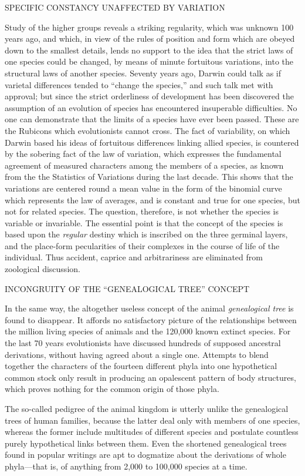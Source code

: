 SPECIFIC CONSTANCY UNAFFECTED BY VARIATION

Study of the higher groups reveals a striking regularity, which was unknown 100 years ago,
and which, in view of the rules of position and form which are obeyed down to the smallest
details, lends no support to the idea that the strict laws of one species could be changed, by
means of minute fortuitous variations, into the structural laws of another species. Seventy
years ago, Darwin could talk as if varietal differences tended to ``change the species,'' and
such talk met with approval; but since the strict orderliness of development has been
discovered the assumption of an evolution of species has encountered insuperable
difficulties. No one can demonstrate that the limits of a species have ever been passed. These
are the Rubicons which evolutionists cannot cross. The fact of variability, on which Darwin
based his ideas of fortuitous differences linking allied species, is countered by the sobering
fact of the law of variation, which expresses the fundamental agreement of measured
characters among the members of a species, as known from the the Statistics of Variations
during the last decade. This shows that the variations are centered round a mean value in the
form of the binomial curve which represents the law of averages, and is constant and true for
one species, but not for related species. The question, therefore, is not whether the species is
variable or invariable. The essential point is that the concept of the species is based upon the
\textit{regular} destiny which is inscribed on the three germinal layers, and the place-form
pecularities of their complexes in the course of life of the individual. Thus accident, caprice
and arbitrariness are eliminated from zoological discussion.

INCONGRUITY OF THE ``GENEALOGICAL TREE'' CONCEPT

In the same way, the altogether useless concept of the animal \textit{genealogical tree} is found to
disappear. It affords no satisfactory picture of the relationships between the million living
species of animals and the 120,000 known extinct species. For the last 70 years evolutionists
have discussed hundreds of supposed ancestral derivations, without having agreed about a
single one. Attempts to blend together the characters of the fourteen different phyla into one
hypothetical common stock only result in producing an opalescent pattern of body structures,
which proves nothing for the common origin of those phyla.

The so-called pedigree of the animal kingdom is utterly unlike the genealogical trees of
human families, because the latter deal only with members of one species, whereas the
former include multitudes of different species and postulate countless purely hypothetical
links between them. Even the shortened genealogical trees found in popular writings are apt
to dogmatize about the derivations of whole phyla—that is, of anything from 2,000 to
100,000 species at a time.

